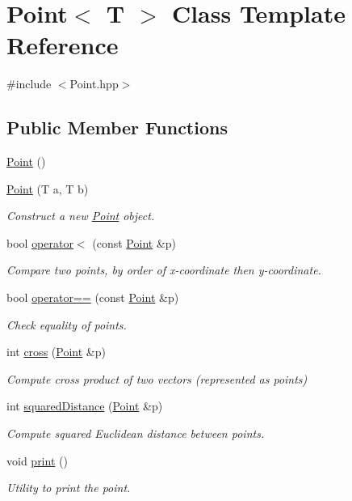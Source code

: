 \hypertarget{classPoint}{}\section{Point$<$ T $>$ Class Template Reference}
\label{classPoint}


{\ttfamily \#include $<$Point.\+hpp$>$}

\subsection*{Public Member Functions}
\begin{DoxyCompactItemize}
\item 
\mbox{\hyperlink{classPoint_aea76b1130f1a203722d8f2254ced8e66}{Point}} ()
\item 
\mbox{\hyperlink{classPoint_a6583d71c9cddfe6e079135c724ea228c}{Point}} (T a, T b)
\begin{DoxyCompactList}\small\item\em Construct a new \mbox{\hyperlink{classPoint}{Point}} object. \end{DoxyCompactList}\item 
bool \mbox{\hyperlink{classPoint_aae9fe5d91cff10489624a97c06943031}{operator$<$}} (const \mbox{\hyperlink{classPoint}{Point}} \&p)
\begin{DoxyCompactList}\small\item\em Compare two points, by order of x-\/coordinate then y-\/coordinate. \end{DoxyCompactList}\item 
bool \mbox{\hyperlink{classPoint_a5241a7c8bfe2a0494b789cad25b52ada}{operator==}} (const \mbox{\hyperlink{classPoint}{Point}} \&p)
\begin{DoxyCompactList}\small\item\em Check equality of points. \end{DoxyCompactList}\item 
int \mbox{\hyperlink{classPoint_ad78df2e18b6b279889e0aee12fe05cc1}{cross}} (\mbox{\hyperlink{classPoint}{Point}} \&p)
\begin{DoxyCompactList}\small\item\em Compute cross product of two vectors (represented as points) \end{DoxyCompactList}\item 
int \mbox{\hyperlink{classPoint_add8d52440f5831624b73ffc2f0efb969}{squared\+Distance}} (\mbox{\hyperlink{classPoint}{Point}} \&p)
\begin{DoxyCompactList}\small\item\em Compute squared Euclidean distance between points. \end{DoxyCompactList}\item 
void \mbox{\hyperlink{classPoint_acc51bfe04c5f9bcb8686e74d8f7b7bc1}{print}} ()
\begin{DoxyCompactList}\small\item\em Utility to print the point. \end{DoxyCompactList}\end{DoxyCompactItemize}
